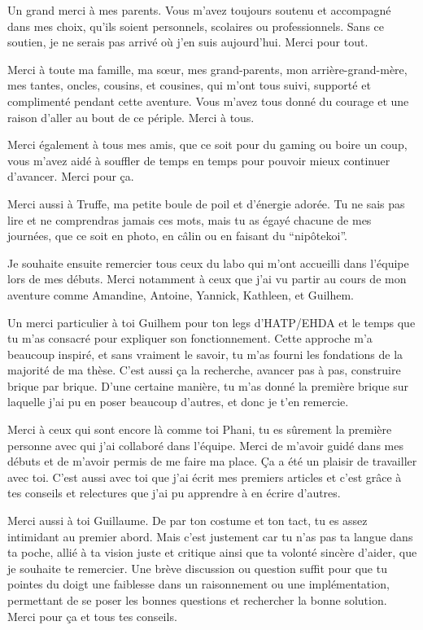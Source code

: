 
Un grand merci à mes parents. Vous m'avez toujours soutenu et accompagné dans mes choix, qu'ils soient personnels, scolaires ou professionnels. Sans ce soutien, je ne serais pas arrivé où j'en suis aujourd'hui. Merci pour tout.

Merci à toute ma famille, ma sœur, mes grand-parents, mon arrière-grand-mère, mes tantes, oncles, cousins, et cousines, qui m'ont tous suivi, supporté et complimenté pendant cette aventure. Vous m'avez tous donné du courage et une raison d'aller au bout de ce périple. Merci à tous.

Merci également à tous mes amis, que ce soit pour du gaming ou boire un coup, vous m'avez aidé à souffler de temps en temps pour pouvoir mieux continuer d'avancer. Merci pour ça.



Merci aussi à Truffe, ma petite boule de poil et d'énergie adorée. Tu ne sais pas lire et ne comprendras jamais ces mots, mais tu as égayé chacune de mes journées, que ce soit en photo, en câlin ou en faisant du ``nipôtekoi''.



Je souhaite ensuite remercier tous ceux du labo qui m'ont accueilli dans l'équipe lors de mes débuts. Merci notamment à ceux que j'ai vu partir au cours de mon aventure comme Amandine, Antoine, Yannick, Kathleen, et Guilhem.

Un merci particulier à toi Guilhem pour ton legs d'HATP/EHDA et le temps que tu m'as consacré pour expliquer son fonctionnement. 
Cette approche m'a beaucoup inspiré, et sans vraiment le savoir, tu m'as fourni les fondations de la majorité de ma thèse. C'est aussi ça la recherche, avancer pas à pas, construire brique par brique. D'une certaine manière, tu m'as donné la première brique sur laquelle j'ai pu en poser beaucoup d'autres, et donc je t'en remercie.

Merci à ceux qui sont encore là comme toi Phani, tu es sûrement la première personne avec qui j'ai collaboré dans l'équipe. Merci de m'avoir guidé dans mes débuts et de m'avoir permis de me faire ma place. Ça a été un plaisir de travailler avec toi. C'est aussi avec toi que j'ai écrit mes premiers articles et c'est grâce à tes conseils et relectures que j'ai pu apprendre à en écrire d'autres.

Merci aussi à toi Guillaume. 
De par ton costume et ton tact, tu es assez intimidant au premier abord. 
Mais c'est justement car tu n'as pas ta langue dans ta poche, allié à ta vision juste et critique ainsi que ta volonté sincère d'aider, que je souhaite te remercier. Une brève discussion ou question suffit pour que tu pointes du doigt une faiblesse dans un raisonnement ou une implémentation, permettant de se poser les bonnes questions et rechercher la bonne solution. Merci pour ça et tous tes conseils.


